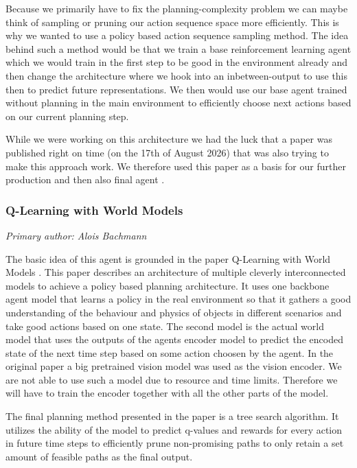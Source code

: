 Because we primarily have to fix the planning-complexity problem we can maybe think of sampling or pruning our action sequence space more efficiently. This is why we wanted to use a policy based action sequence sampling method. The idea behind such a method would be that we train a base reinforcement learning agent which we would train in the first step to be good in the environment already and then change the architecture where we hook into an inbetween-output to use this then to predict future representations. We then would use our base agent trained without planning in the main environment to efficiently choose next actions based on our current planning step.

While we were working on this architecture we had the luck that a paper was published right on time (on the 17th of August 2026) that was also trying to make this approach work. We therefore used this paper as a basis for our further production and then also final agent \cite{dong2026qwm}.

\subsubsection{Q-Learning with World Models}

\textit{Primary author: Alois Bachmann}

The basic idea of this agent is grounded in the paper Q-Learning with World Models \cite{dong2026qwm}. This paper describes an architecture of multiple cleverly interconnected models to achieve a policy based planning architecture. It uses one backbone agent model that learns a policy in the real environment so that it gathers a good understanding of the behaviour and physics of objects in different scenarios and take good actions based on one state. The second model is the actual world model that uses the outputs of the agents encoder model to predict the encoded state of the next time step based on some action choosen by the agent. In the original paper a big pretrained vision model was used as the vision encoder. We are not able to use such a model due to resource and time limits. Therefore we will have to train the encoder together with all the other parts of the model.

The final planning method presented in the paper is a tree search algorithm. It utilizes the ability of the model to predict q-values and rewards for every action in future time steps to efficiently prune non-promising paths to only retain a set amount of feasible paths as the final output. 

